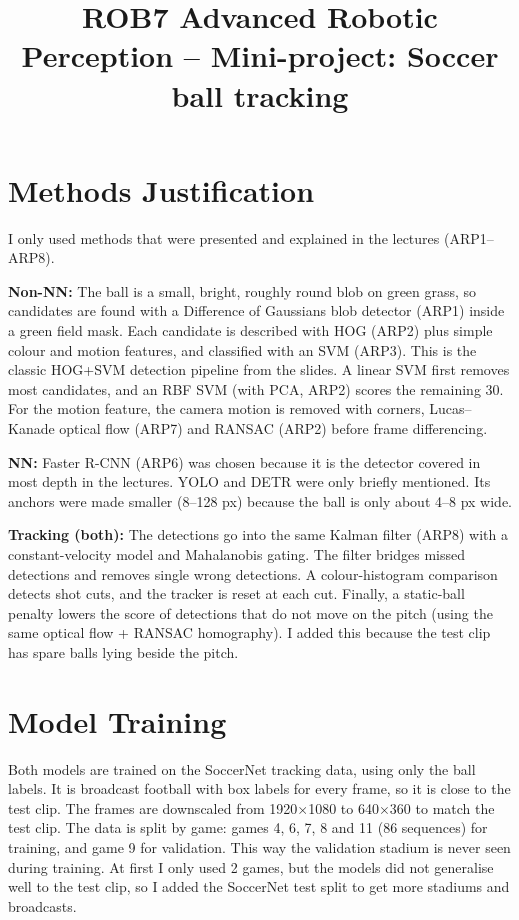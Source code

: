 \documentclass[12pt]{article}
\begin{document}
\title{ROB7 Advanced Robotic Perception -- Mini-project: Soccer ball tracking}
\date{}
\maketitle

\section{Methods Justification}
I only used methods that were presented and explained in the lectures (ARP1--ARP8).

\textbf{Non-NN:} The ball is a small, bright, roughly round blob on green grass, so candidates are found with a Difference of Gaussians blob detector (ARP1) inside a green field mask. Each candidate is described with HOG (ARP2) plus simple colour and motion features, and classified with an SVM (ARP3). This is the classic HOG+SVM detection pipeline from the slides. A linear SVM first removes most candidates, and an RBF SVM (with PCA, ARP2) scores the remaining 30. For the motion feature, the camera motion is removed with corners, Lucas--Kanade optical flow (ARP7) and RANSAC (ARP2) before frame differencing.

\textbf{NN:} Faster R-CNN (ARP6) was chosen because it is the detector covered in most depth in the lectures. YOLO and DETR were only briefly mentioned. Its anchors were made smaller (8--128 px) because the ball is only about 4--8 px wide.

\textbf{Tracking (both):} The detections go into the same Kalman filter (ARP8) with a constant-velocity model and Mahalanobis gating. The filter bridges missed detections and removes single wrong detections. A colour-histogram comparison detects shot cuts, and the tracker is reset at each cut. Finally, a static-ball penalty lowers the score of detections that do not move on the pitch (using the same optical flow + RANSAC homography). I added this because the test clip has spare balls lying beside the pitch.

\section{Model Training}
Both models are trained on the SoccerNet tracking data, using only the ball labels. It is broadcast football with box labels for every frame, so it is close to the test clip. The frames are downscaled from 1920$\times$1080 to 640$\times$360 to match the test clip. The data is split by game: games 4, 6, 7, 8 and 11 (86 sequences) for training, and game 9 for validation. This way the validation stadium is never seen during training. At first I only used 2 games, but the models did not generalise well to the test clip, so I added the SoccerNet test split to get more stadiums and broadcasts.
\end{document}
